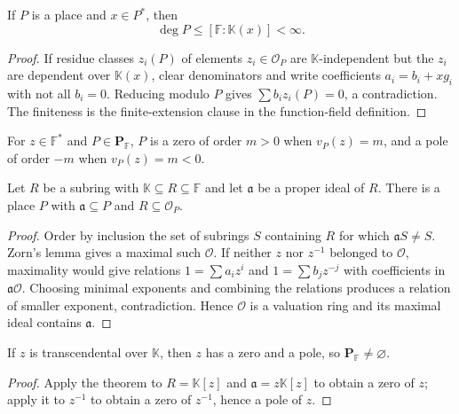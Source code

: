 \begin{theorem}
\label{par-thm-place-degree}
\uses{}
If $P$ is a place and $x\in P^*$, then
\[
\deg P\leq[\mathbb F:\mathbb K(x)]<\infty.
\]
\end{theorem}
\begin{proof}
If residue classes $z_i(P)$ of elements $z_i\in\mathcal O_P$ are
$\mathbb K$-independent but the $z_i$ are dependent over $\mathbb K(x)$,
clear denominators and write coefficients $a_i=b_i+xg_i$ with not all $b_i=0$.
Reducing modulo $P$ gives $\sum b_i z_i(P)=0$, a contradiction. The finiteness
is the finite-extension clause in the function-field definition.
\end{proof}

\begin{definition}
\label{par-def-zero-pole}
\uses{}
For $z\in\mathbb F^*$ and $P\in\mathbf P_{\mathbb F}$, $P$ is a zero of order
$m>0$ when $v_P(z)=m$, and a pole of order $-m$ when $v_P(z)=m<0$.
\end{definition}

\begin{theorem}
\label{par-thm-place-existence}
\uses{}
Let $R$ be a subring with $\mathbb K\subseteq R\subseteq\mathbb F$ and let
$\mathfrak a$ be a proper ideal of $R$. There is a place $P$ with
$\mathfrak a\subseteq P$ and $R\subseteq\mathcal O_P$.
\end{theorem}
\begin{proof}
Order by inclusion the set of subrings $S$ containing $R$ for which
$\mathfrak aS\neq S$. Zorn's lemma gives a maximal such $\mathcal O$.
If neither $z$ nor $z^{-1}$ belonged to $\mathcal O$, maximality would give
relations $1=\sum a_i z^i$ and $1=\sum b_jz^{-j}$ with coefficients in
$\mathfrak a\mathcal O$. Choosing minimal exponents and combining the relations
produces a relation of smaller exponent, contradiction. Hence $\mathcal O$ is a
valuation ring and its maximal ideal contains $\mathfrak a$.
\end{proof}

\begin{corollary}
\label{par-cor-zero-pole}
\uses{}
If $z$ is transcendental over $\mathbb K$, then $z$ has a zero and a pole, so
$\mathbf P_{\mathbb F}\neq\varnothing$.
\end{corollary}
\begin{proof}
Apply the theorem to $R=\mathbb K[z]$ and $\mathfrak a=z\mathbb K[z]$ to obtain
a zero of $z$; apply it to $z^{-1}$ to obtain a zero of $z^{-1}$, hence a pole of $z$.
\end{proof}

